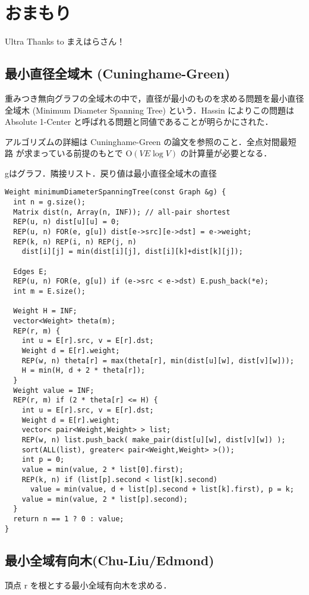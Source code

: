 \section{おまもり}

Ultra Thanks to まえはらさん！


\subsection{最小直径全域木 (Cuninghame-Green)}

重みつき無向グラフの全域木の中で，直径が最小のものを求める問題を最小直径全域木 (Minimum Diameter Spanning Tree) という．Hassin によりこの問題は Absolute 1-Center と呼ばれる問題と同値であることが明らかにされた．

アルゴリズムの詳細は Cuninghame-Green の論文を参照のこと．全点対間最短路
が求まっている前提のもとで $\mathrm{O}(V E \log V)$ の計算量が必要となる．

gはグラフ．隣接リスト．戻り値は最小直径全域木の直径

\begin{lstlisting}
Weight minimumDiameterSpanningTree(const Graph &g) {
  int n = g.size();
  Matrix dist(n, Array(n, INF)); // all-pair shortest
  REP(u, n) dist[u][u] = 0;
  REP(u, n) FOR(e, g[u]) dist[e->src][e->dst] = e->weight;
  REP(k, n) REP(i, n) REP(j, n)
    dist[i][j] = min(dist[i][j], dist[i][k]+dist[k][j]);

  Edges E;
  REP(u, n) FOR(e, g[u]) if (e->src < e->dst) E.push_back(*e);
  int m = E.size();

  Weight H = INF;
  vector<Weight> theta(m);
  REP(r, m) {
    int u = E[r].src, v = E[r].dst;
    Weight d = E[r].weight;
    REP(w, n) theta[r] = max(theta[r], min(dist[u][w], dist[v][w]));
    H = min(H, d + 2 * theta[r]);
  }
  Weight value = INF;
  REP(r, m) if (2 * theta[r] <= H) {
    int u = E[r].src, v = E[r].dst;
    Weight d = E[r].weight;
    vector< pair<Weight,Weight> > list;
    REP(w, n) list.push_back( make_pair(dist[u][w], dist[v][w]) );
    sort(ALL(list), greater< pair<Weight,Weight> >());
    int p = 0;
    value = min(value, 2 * list[0].first);
    REP(k, n) if (list[p].second < list[k].second)
      value = min(value, d + list[p].second + list[k].first), p = k;
    value = min(value, 2 * list[p].second);
  }
  return n == 1 ? 0 : value;
}
\end{lstlisting}




\subsection{最小全域有向木(Chu-Liu/Edmond)}
頂点 r を根とする最小全域有向木を求める．

